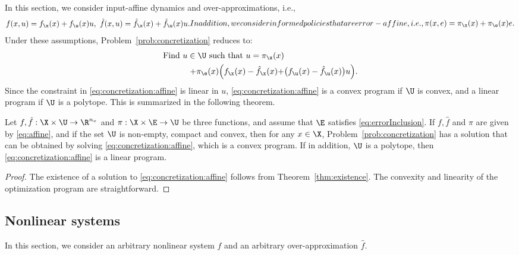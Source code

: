 \documentclass[letterpaper, 10 pt, conference]{ieeeconf}  %
\begin{document}
In this section, we consider input-affine dynamics and over-approximations, i.e.,%
\begin{subequations}\label{eq:affine}
\begin{align}\label{eq:inputAffine}
f(x,u)=f_\x(x)+f_\u(x)u,\ \hat{f}(x,u)=\hat{f}_\x(x)+\hat{f}_\u(x)u.
\end{align}
In addition, we consider informed policies that are error-affine, i.e.,
\begin{align}\label{eq:errorAffine}
\pi(x,e)=\pi_\x(x)+\pi_\e(x)e.
\end{align}
\end{subequations}
Under these assumptions, Problem~\ref{prob:concretization} reduces to:
\begin{align}\label{eq:concretization:affine}
\text{Find}\ u\in\U \text{ such that }
u=\pi_\x(x)&\\
+\pi_\e(x) \Big(f_\x(x) - \hat{f}_\x(x) +& \big(f_\u(x)-\hat{f}_\u(x)\big)u\Big). \notag
\end{align}
Since the constraint in \eqref{eq:concretization:affine} is linear in $u$, \eqref{eq:concretization:affine} is a convex program if $\U$ is convex, and a linear program if $\U$ is a polytope. This is summarized in the following theorem.

\begin{theorem}
Let $f,\hat{f}:\X\times\U\rightarrow\R^{n_x}$ and $\pi:\X\times\E\rightarrow\U$ be three functions, and assume that $\E$ satisfies \eqref{eq:errorInclusion}. If $f,\hat{f}$ and $\pi$ are given by \eqref{eq:affine}, and if the set $\U$ is non-empty, compact and convex, then for any $x\in\X$, Problem~\ref{prob:concretization} has a solution that can be obtained by solving \eqref{eq:concretization:affine}, which is a convex program. If in addition, $\U$ is a polytope, then \eqref{eq:concretization:affine} is a linear program. 
\end{theorem}
\begin{proof}
The existence of a solution to \eqref{eq:concretization:affine} follows from Theorem~\ref{thm:existence}. The convexity and linearity of the optimization program are straightforward.
\end{proof}

\subsection{Nonlinear systems}
In this section, we consider an arbitrary nonlinear system $f$ and an arbitrary over-approximation $\hat{f}$.
\end{document}
